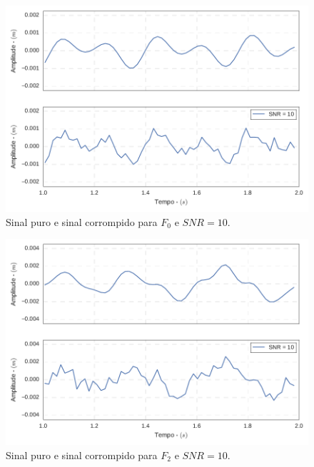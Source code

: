 \begin{figure}
	\centering
	\includegraphics[scale=0.6]{IMGS/F0_noise_10}
	\caption{Sinal puro e sinal corrompido para $ F_0 $ e $ SNR=10 $.}
	\label{fig:F0_noise_10}
\end{figure}

\begin{figure}
	\centering
	\includegraphics[scale=0.6]{IMGS/F2_noise_10}
	\caption{Sinal puro e sinal corrompido para $ F_2 $ e $ SNR=10 $.}
	\label{fig:F2_noise_10}
\end{figure}

